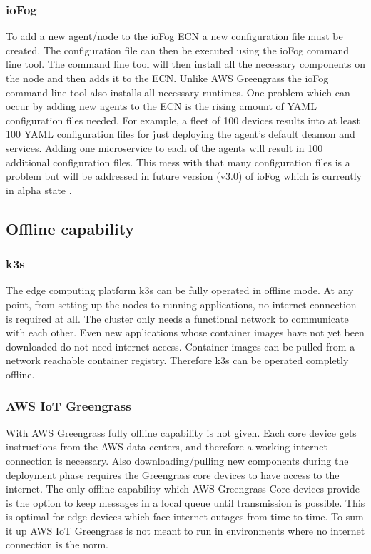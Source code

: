 \subsubsection*{ioFog}
To add a new agent/node to the ioFog \gls{ECN} a new configuration file must be created. The configuration file can then be executed using the ioFog command line tool. The command line tool will then install all the necessary components on the node and then adds it to the \gls{ECN}. Unlike AWS Greengrass the ioFog command line tool also installs all necessary runtimes. One problem which can occur by adding new agents to the \gls{ECN} is the rising amount of YAML configuration files needed. For example, a fleet of 100 devices results into at least 100 YAML configuration files for just deploying the agent's default deamon and services. Adding one microservice to each of the agents will result in 100 additional configuration files. This mess with that many configuration files is a problem but will be addressed in future version (v3.0) of ioFog which is currently in alpha state \cite{ioFogTemplateEngine}.

\subsection*{Offline capability}
\subsubsection*{k3s}
The edge computing platform k3s can be fully operated in offline mode. At any point, from setting up the nodes to running applications, no internet connection is required at all. The cluster only needs a functional network to communicate with each other. Even new applications whose container images have not yet been downloaded do not need internet access. Container images can be pulled from a network reachable container registry. Therefore k3s can be operated completly offline.

\subsubsection*{AWS IoT Greengrass}
With AWS Greengrass fully offline capability is not given. Each core device gets instructions from the AWS data centers, and therefore a working internet connection is necessary. Also downloading/pulling new components during the deployment phase requires the Greengrass core devices to have access to the internet. The only offline capability which AWS Greengrass Core devices provide is the option to keep messages in a local queue until transmission is possible. This is optimal for edge devices which face internet outages from time to time. To sum it up AWS IoT Greengrass is not meant to run in environments where no internet connection is the norm.


